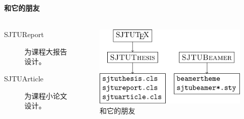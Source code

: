 \begin{frame}
  \frametitle{\SJTUTeX{}}
  \framesubtitle{和它的朋友}

  \begin{columns}
    \begin{column}{.45\textwidth}
      \begin{description}
        \item[SJTUReport] 为课程大报告设计。
        \item[SJTUArticle] 为课程小论文设计。
      \end{description}
    \end{column}
    \begin{column}{.5\textwidth}
      \begin{figure}
        \includegraphics{support/figures/sjtutex.pdf}
        \caption{\SJTUTeX{} 和它的朋友}
      \end{figure}    
    \end{column}
  \end{columns}

\end{frame}

